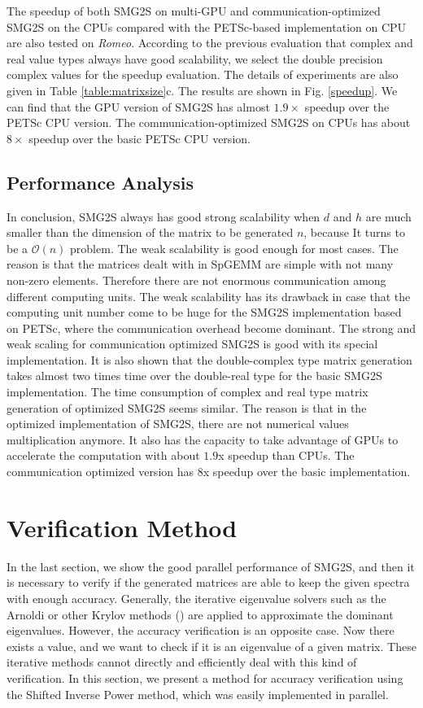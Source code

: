 The speedup of both SMG2S on multi-GPU and communication-optimized SMG2S on the CPUs compared with the PETSc-based implementation on CPU are also tested on \textit{Romeo}. According to the previous evaluation that complex and real value types always have good scalability, we select the double precision complex values for the speedup evaluation. The details of experiments are also given in Table \ref{table:matrixsize}c. The results are shown in Fig. \ref{speedup}. We can find that the GPU version of SMG2S has almost $1.9\times$ speedup over the PETSc CPU version. The communication-optimized SMG2S on CPUs has about $8\times$ speedup over the basic PETSc CPU version.

\subsection{Performance Analysis}

In conclusion, SMG2S always has good strong scalability when $d$ and $h$ are much smaller than the dimension of the matrix to be generated $n$, because It turns to be a $\mathcal{O}(n)$ problem. The weak scalability is good enough for most cases. The reason is that the matrices dealt with in SpGEMM are simple with not many non-zero elements. Therefore there are not enormous communication among different computing units. The weak scalability has its drawback in case that the computing unit number come to be huge for the SMG2S implementation based on PETSc, where the communication overhead become dominant. The strong and weak scaling for communication optimized SMG2S is good with its special implementation. It is also shown that the double-complex type matrix generation takes almost two times time over the double-real type for the basic SMG2S implementation. The time consumption of complex and real type matrix generation of optimized SMG2S seems similar. The reason is that in the optimized implementation of SMG2S, there are not numerical values multiplication anymore.  It also has the capacity to take advantage of GPUs to accelerate the computation with about $1.9$x speedup than CPUs. The communication optimized version has $8$x speedup over the basic implementation.

\section{Verification Method}\label{Verification Method}

In the last section, we show the good parallel performance of SMG2S, and then it is necessary to verify if the generated matrices are able to keep the given spectra with enough accuracy. Generally, the iterative eigenvalue solvers such as the Arnoldi or other Krylov methods (\cite{petiton1992parallel}) are applied to approximate the dominant eigenvalues. However, the accuracy verification is an opposite case. Now there exists a value, and we want to check if it is an eigenvalue of a given matrix. These iterative methods cannot directly and efficiently deal with this kind of verification. In this section, we present a method for accuracy verification using the Shifted Inverse Power method, which was easily implemented in parallel.

